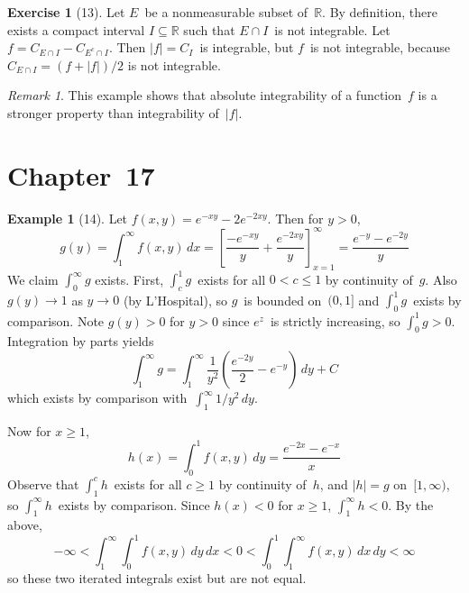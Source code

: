 \documentclass[letterpaper,12pt]{article}
\newcommand{\R}{\mathbb{R}}
\newcommand{\sect}{\cap}
\renewcommand{\d}[1]{\,d\!{#1}}
\newcommand{\dx}{\d{x}}
\newcommand{\dy}{\d{y}}
\newcommand{\abs}[1]{|{#1}|}
\newcommand{\comp}[1]{#1^c}
\theoremstyle{plain}
\theoremstyle{definition}
\newtheorem*{exmp}{Example}
\newtheorem*{exer}{Exercise}
\theoremstyle{remark}
\newtheorem*{rmk}{Remark}
\begin{document}
\begin{exer}[13]
Let \(E\)~be a nonmeasurable subset of~\(\R\). By definition, there exists a compact interval \(I\subseteq\R\) such that \(E\sect I\)~is not integrable. Let \(f=C_{E\sect I}-C_{\comp{E}\sect I}\). Then \(\abs{f}=C_I\)~is integrable, but \(f\)~is not integrable, because \(C_{E\sect I}=(f+\abs{f})/2\) is not integrable.
\end{exer}
\begin{rmk}
This example shows that absolute integrability of a function~\(f\) is a stronger property than integrability of~\(\abs{f}\).
\end{rmk}

\section*{Chapter~17}
\begin{exmp}[14]
Let \(f(x,y)=e^{-xy}-2e^{-2xy}\). Then for \(y>0\),
\[g(y)=\int_1^{\infty}f(x,y)\dx=\left[\frac{-e^{-xy}}{y}+\frac{e^{-2xy}}{y}\right]_{x=1}^{\infty}=\frac{e^{-y}-e^{-2y}}{y}\]
We claim \(\int_0^{\infty}g\) exists. First, \(\int_c^1 g\)~exists for all \(0<c\le 1\) by continuity of~\(g\). Also \(g(y)\to 1\) as \(y\to 0\) (by L'Hospital), so \(g\)~is bounded on~\((0,1]\) and \(\int_0^1 g\)~exists by comparison. Note \(g(y)>0\) for \(y>0\) since \(e^z\)~is strictly increasing, so \(\int_0^1g>0\). Integration by parts yields
\[\int_1^{\infty}g=\int_1^{\infty}\frac{1}{y^2}\left(\frac{e^{-2y}}{2}-e^{-y}\right)\dy+C\]
which exists by comparison with~\(\int_1^{\infty}1/y^2\dy\).

Now for \(x\ge 1\),
\[h(x)=\int_0^1 f(x,y)\dy=\frac{e^{-2x}-e^{-x}}{x}\]
Observe that \(\int_1^c h\)~exists for all \(c\ge 1\) by continuity of~\(h\), and \(\abs{h}=g\) on~\([1,\infty)\), so \(\int_1^{\infty}h\)~exists by comparison. Since \(h(x)<0\) for \(x\ge 1\), \(\int_1^{\infty}h<0\). By the above,
\[-\infty<\int_1^{\infty}\int_0^1 f(x,y)\dy\dx<0<\int_0^1\int_1^{\infty}f(x,y)\dx\dy<\infty\]
so these two iterated integrals exist but are not equal.
\end{exmp}
\end{document}
